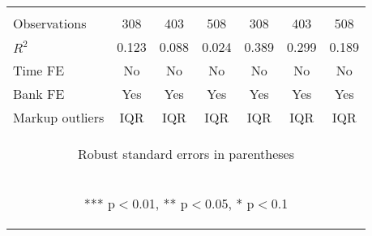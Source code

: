 \documentclass[]{article}
\begin{document}
\begin{center}
\begin{tabular}{lcccccc}
\vspace{4pt} & \begin{footnotesize}\end{footnotesize} & \begin{footnotesize}\end{footnotesize} & \begin{footnotesize}\end{footnotesize} & \begin{footnotesize}\end{footnotesize} & \begin{footnotesize}\end{footnotesize} & \begin{footnotesize}\end{footnotesize} \\
Observations & 308 & 403 & 508 & 308 & 403 & 508 \\
$R^2$ & 0.123 & 0.088 & 0.024 & 0.389 & 0.299 & 0.189 \\
Time FE & No & No & No & No & No & No \\
Bank FE & Yes & Yes & Yes & Yes & Yes & Yes \\
 Markup outliers & IQR & IQR & IQR & IQR & IQR & IQR \\ \hline
\multicolumn{7}{c}{\begin{footnotesize} Robust standard errors in parentheses\end{footnotesize}} \\
\multicolumn{7}{c}{\begin{footnotesize} *** p$<$0.01, ** p$<$0.05, * p$<$0.1\end{footnotesize}} \\
\end{tabular}
\end{center}
\end{document}
